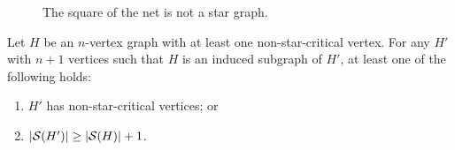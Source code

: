 \begin{figure}[!htb]
        \centering
        \caption{The square of the net is not a star graph.\label{fig:square_not_star}}
\end{figure}

\begin{theorem}
    \label{thm:monotonicity}
    Let $H$ be an $n$-vertex graph with at least one non-star-critical vertex.
    For any $H'$ with $n+1$ vertices such that $H$ is an induced subgraph of $H'$, at least one of the following holds:
    \begin{enumerate}
        \item $H'$ has non-star-critical vertices; or
        \item $|\mathcal{S}(H')| \geq |\mathcal{S}(H)| + 1$.
    \end{enumerate}
\end{theorem}

